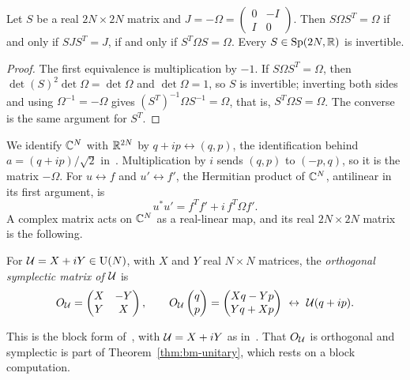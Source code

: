 \begin{vetdenv}
\begin{lemma}\label{lem:bm-symplectic}
Let $S$ be a real $2N\times2N$ matrix and $J=-\Omega=\left(\begin{smallmatrix}0&-I\\I&0\end{smallmatrix}\right)$.
Then $S\Omega S^T=\Omega$ if and only if $SJS^T=J$, if and only if $S^T\Omega S=\Omega$. Every $S\in\mathrm{Sp}(2N,\mathbb R)$ is invertible.
\end{lemma}

\begin{proof}
The first equivalence is multiplication by $-1$. If $S\Omega S^T=\Omega$, then $\det(S)^2\det\Omega=\det\Omega$ and
$\det\Omega=1$, so $S$ is invertible; inverting both sides and using $\Omega^{-1}=-\Omega$ gives
$(S^T)^{-1}\Omega S^{-1}=\Omega$, that is, $S^T\Omega S=\Omega$. The converse is the same argument for $S^T$.
\end{proof}

We identify $\mathbb C^N$ with $\mathbb R^{2N}$ by $q+ip\leftrightarrow(q,p)$, the identification behind
$a=(q+ip)/\sqrt2$ in~\cite[(A18)]{tjoacirac}. Multiplication by $i$ sends $(q,p)$ to $(-p,q)$, so it is the matrix
$-\Omega$. For $u\leftrightarrow f$ and $u'\leftrightarrow f'$, the Hermitian product of $\mathbb C^N$, antilinear in its first
argument, is
\begin{equation}\label{eq:bm-herm}
 u^*u'=f^Tf'+i\,f^T\Omega f' .
\end{equation}
A complex matrix acts on $\mathbb C^N$ as a real-linear map, and its real $2N\times2N$ matrix is the following.

\begin{definition}\label{def:bm-osp}
For $\mathcal U=X+iY\in\mathrm{U}(N)$, with $X$ and $Y$ real $N\times N$ matrices, the \emph{orthogonal symplectic matrix of $\mathcal U$} is
\[
 O_\cU=\begin{pmatrix}X&-Y\\Y&X\end{pmatrix},\qquad
 O_\cU\begin{pmatrix}q\\p\end{pmatrix}=\begin{pmatrix}Xq-Yp\\Yq+Xp\end{pmatrix}\ \leftrightarrow\ \cU(q+ip).
\]
\end{definition}

This is the block form of~\cite[(A14)]{tjoacirac}, with $\mathcal U=X+iY$ as in~\cite[(A16)]{tjoacirac}. That $O_\mathcal U$ is
orthogonal and symplectic is part of Theorem~\ref{thm:bm-unitary}, which rests on a block computation.


\end{vetdenv}
